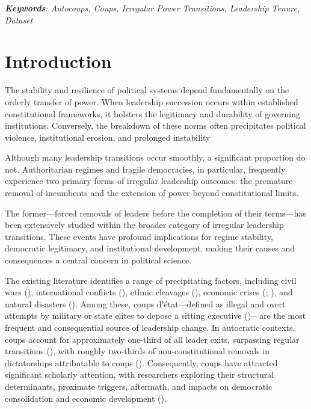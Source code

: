 \documentclass[
  12pt,
]{report}
\begin{document}
\emph{\textbf{Keywords}: Autocoups, Coups, Irregular Power Transitions,
Leadership Tenure, Dataset}

\section{Introduction}\label{introduction-1}

The stability and resilience of political systems depend fundamentally
on the orderly transfer of power. When leadership succession occurs
within established constitutional frameworks, it bolsters the legitimacy
and durability of governing institutions. Conversely, the breakdown of
these norms often precipitates political violence, institutional
erosion, and prolonged instability

Although many leadership transitions occur smoothly, a significant
proportion do not. Authoritarian regimes and fragile democracies, in
particular, frequently experience two primary forms of irregular
leadership outcomes: the premature removal of incumbents and the
extension of power beyond constitutional limits.

The former---forced removals of leaders before the completion of their
terms---has been extensively studied within the broader category of
irregular leadership transitions. These events have profound
implications for regime stability, democratic legitimacy, and
institutional development, making their causes and consequences a
central concern in political science.

The existing literature identifies a range of precipitating factors,
including civil wars (), international conflicts (), ethnic cleavages
(),
economic crises (;
), and natural
disasters (). Among these, coups d'état---defined as illegal and overt
attempts by military or state elites to depose a sitting executive
()---are the most
frequent and consequential source of leadership change. In autocratic
contexts, coups account for approximately one-third of all leader exits,
surpassing regular transitions (), with roughly two-thirds of non-constitutional removals in
dictatorships attributable to coups (). Consequently, coups have attracted significant scholarly
attention, with researchers exploring their structural determinants,
proximate triggers, aftermath, and impacts on democratic consolidation
and economic development ().
\end{document}
